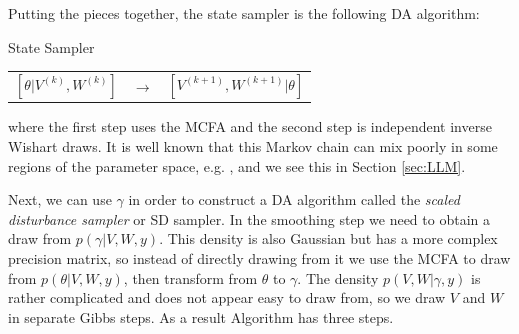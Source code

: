\documentclass[12pt]{article}
\begin{document}
Putting the pieces together, the state sampler is the following DA algorithm:
\begin{alg*}[State]State Sampler\label{alg:DLMstate}
{\small \vspace{-.5cm}
\begin{center}
\begin{tabular}{lll}
$[\theta|V^{(k)},W^{(k)}]$ & $\to$ & $[V^{(k+1)},W^{(k+1)}|\theta]$
\end{tabular}
\end{center}
}
\end{alg*}
\noindent where the first step uses the MCFA and the second step is independent inverse Wishart draws. It is well known that this Markov chain can mix poorly in some regions of the parameter space, e.g. \citet{fruhwirth2004efficient}, and we see this in Section \ref{sec:LLM}.

Next, we can use $\gamma$ in order to construct a DA algorithm called the {\it scaled disturbance sampler} or SD sampler. In the smoothing step we need to obtain a draw from $p(\gamma|V,W,y)$. This density is also Gaussian but has a more complex precision matrix, so instead of directly drawing from it we use the MCFA to draw from $p(\theta|V,W,y)$, then transform from $\theta$ to $\gamma$. The density $p(V,W|\gamma,y)$ is rather complicated and does not appear easy to draw from, so we draw $V$ and $W$ in separate Gibbs steps. As a result Algorithm  has three steps. 
\end{document}
